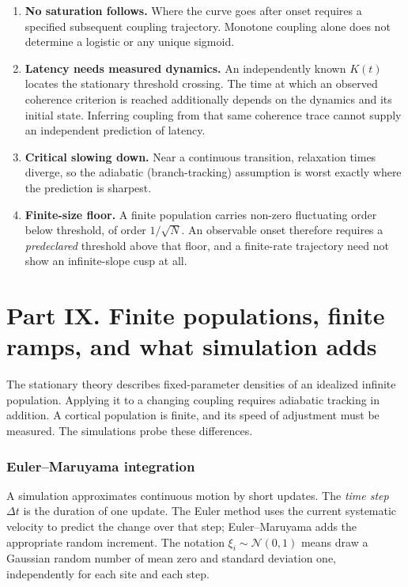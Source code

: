 \documentclass[11pt]{article}
\begin{document}
\begin{enumerate}[leftmargin=*]
\item \textbf{No saturation follows.} Where the curve goes after onset requires
a specified subsequent coupling trajectory. Monotone coupling alone does not
determine a logistic or any unique sigmoid.
\item \textbf{Latency needs measured dynamics.} An independently known $K(t)$
locates the stationary threshold crossing. The time at which an observed
coherence criterion is reached additionally depends on the dynamics and its
initial state. Inferring coupling from that same coherence trace cannot supply
an independent prediction of latency.
\item \textbf{Critical slowing down.} Near a continuous transition, relaxation
times diverge, so the adiabatic (branch-tracking) assumption is worst exactly
where the prediction is sharpest.
\item \textbf{Finite-size floor.} A finite population carries non-zero
fluctuating order below threshold, of order $1/\sqrt N$. An observable onset
therefore requires a \emph{predeclared} threshold above that floor, and a
finite-rate trajectory need not show an infinite-slope cusp at all.
\end{enumerate}

\part*{Part IX. Finite populations, finite ramps, and what simulation adds}

The stationary theory describes fixed-parameter densities of an idealized
infinite population. Applying it to a changing coupling requires adiabatic
tracking in addition. A cortical population is finite, and its speed of
adjustment must be measured. The simulations probe these differences.

\section{Euler--Maruyama integration}

A simulation approximates continuous motion by short updates. The \emph{time
step} $\Delta t$ is the duration of one update. The Euler method uses the
current systematic velocity to predict the change over that step;
Euler--Maruyama adds the appropriate random increment. The notation
$\xi_i\sim\mathcal N(0,1)$ means draw a Gaussian random number of mean zero
and standard deviation one, independently for each site and each step.
\end{document}
